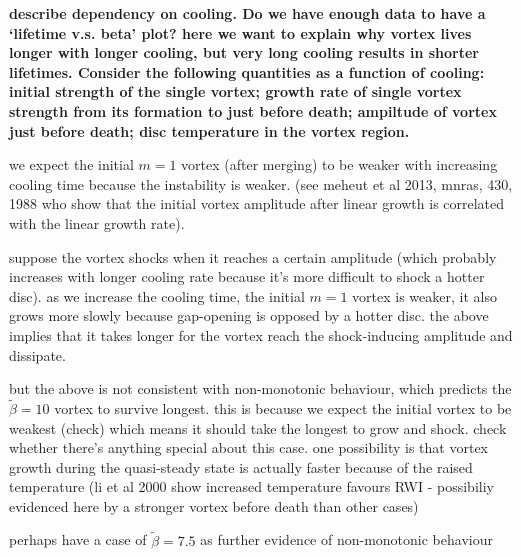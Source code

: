 {\bf describe dependency on
cooling. Do we have enough data to have a `lifetime v.s. beta'
  plot? here we want to explain why vortex lives longer with longer
  cooling, but very long cooling results in shorter lifetimes. 
  Consider the following quantities as a function of cooling:
  initial strength of the single vortex; growth rate of single vortex
  strength from its formation to just before death; ampiltude of
  vortex just before death; disc temperature in the vortex region. 

  we expect the initial $m=1$ vortex (after merging) to be weaker with
  increasing cooling time because the instability is weaker. (see
  meheut et al 2013, mnras, 430, 1988 who show that the initial vortex
  amplitude after linear growth is correlated with the linear growth
  rate). 

  suppose the vortex shocks when it reaches a certain amplitude (which
  probably increases with longer cooling rate because it's more
  difficult to shock a hotter disc). as we
  increase the cooling time, the initial $m=1$ vortex is weaker, it
  also grows more slowly because gap-opening is opposed by a hotter
  disc. the above implies that it takes longer for the vortex reach
  the shock-inducing amplitude and dissipate.  

  but the above is not consistent with non-monotonic behaviour, which
  predicts the $\tilde{\beta}=10$ vortex to survive longest. this is
  because we expect the initial vortex to be weakest (check) which
  means it should take the longest to grow and shock. check
  whether there's anything special about this case. one possibility is
  that vortex growth during the quasi-steady state is actually faster
  because of the raised temperature (li et al 2000 show increased
  temperature favours RWI - possibiliy evidenced here by a stronger
  vortex before death than other cases) 

  perhaps have a case of $\tilde{\beta}=7.5$ as further evidence of
  non-monotonic behaviour
}

